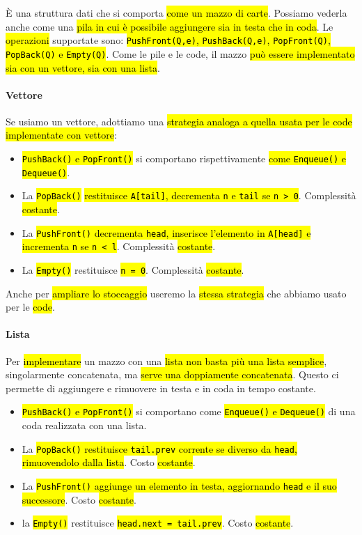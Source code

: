 \documentclass[a4paper,11pt,twoside]{article}
\theoremstyle{plain}
\theoremstyle{definition}
\theoremstyle{remark}
\begin{document}
È una struttura dati che si comporta \hl{come un mazzo di carte}. Possiamo
vederla anche come una \hl{pila in cui è possibile aggiungere sia in testa che
in coda}. Le \hl{operazioni} supportate sono: \hl{\texttt{PushFront(Q,e)},
\texttt{PushBack(Q,e)}, \texttt{PopFront(Q)}, \texttt{PopBack(Q)} e
\texttt{Empty(Q)}}. Come le pile e le code, il mazzo \hl{può essere implementato
sia con un vettore, sia con una lista}.

\paragraph{Vettore} Se usiamo un vettore, adottiamo una \hl{strategia analoga a
quella usata per le code implementate con vettore}:

\begin{itemize}
  \item \hl{\texttt{PushBack()} e \texttt{PopFront()}} si comportano
    rispettivamente \hl{come \texttt{Enqueue()} e \texttt{Dequeue()}}.
  \item La \hl{\texttt{PopBack()}} \hl{restituisce \texttt{A[tail]}, decrementa
    \texttt{n} e \texttt{tail} se \texttt{n > 0}}. Complessità \hl{costante}.
  \item La \hl{\texttt{PushFront()} decrementa \texttt{head}, inserisce
    l'elemento in \texttt{A[head]} e incrementa \texttt{n} se \texttt{n < l}}.
    Complessità \hl{costante}.
  \item La \hl{\texttt{Empty()}} restituisce \hl{\texttt{n = 0}}. Complessità
    \hl{costante}.
\end{itemize}

\noindent Anche per \hl{ampliare lo stoccaggio} useremo la \hl{stessa strategia}
che abbiamo usato per le \hl{code}.

\paragraph{Lista} Per \hl{implementare} un mazzo con una \hl{lista non basta più
una lista semplice}, singolarmente concatenata, ma \hl{serve una doppiamente
concatenata}. Questo ci permette di aggiungere e rimuovere in testa e in coda in
tempo costante.

\begin{itemize}
  \item \hl{\texttt{PushBack()} e \texttt{PopFront()}} si comportano come
    \hl{\texttt{Enqueue()} e \texttt{Dequeue()}} di una coda realizzata con una
    lista.
  \item La \hl{\texttt{PopBack()} restituisce \texttt{tail.prev} corrente se
    diverso da \texttt{head}, rimuovendolo dalla lista}. Costo \hl{costante}.
  \item La \hl{\texttt{PushFront()} aggiunge un elemento in testa, aggiornando
    \texttt{head} e il suo successore}. Costo \hl{costante}.
  \item la \hl{\texttt{Empty()}} restituisce \hl{\texttt{head.next =
    tail.prev}}. Costo \hl{costante}.
\end{itemize}
\end{document}
